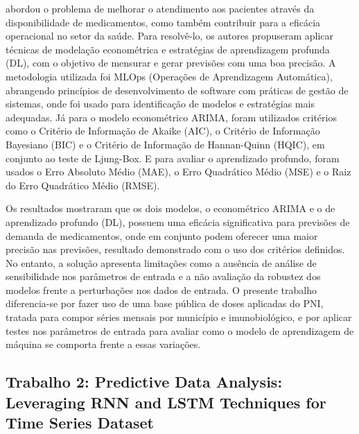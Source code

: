 \documentclass[
    12pt,                %
    openright,           %
    oneside,             %
    a4paper,             %
    english,             %
    brazil               %
]{abntex2}
\begin{document}
 abordou o problema de melhorar o atendimento aos pacientes através da disponibilidade de medicamentos, como também contribuir para a eficácia operacional no setor da saúde. Para resolvê-lo, os autores propuseram aplicar técnicas de modelação econométrica e estratégias de aprendizagem profunda (DL), com o objetivo de mensurar e gerar previsões com uma boa precisão. A metodologia utilizada foi MLOps (Operações de Aprendizagem Automática), abrangendo princípios de desenvolvimento de software com práticas de gestão de sistemas, onde foi usado para identificação de modelos e estratégias mais adequadas. Já para o modelo econométrico ARIMA, foram utilizados critérios como o Critério de Informação de Akaike (AIC), o Critério de Informação Bayesiano (BIC) e o Critério de Informação de Hannan-Quinn (HQIC), em conjunto ao teste de Ljung-Box. E para avaliar o aprendizado profundo, foram usados o Erro Absoluto Médio (MAE), o Erro Quadrático Médio (MSE) e o Raiz do Erro Quadrático Médio (RMSE).

Os resultados mostraram que os dois modelos, o econométrico ARIMA e o de aprendizado profundo (DL), possuem uma eficácia significativa para previsões de demanda de medicamentos, onde em conjunto podem oferecer uma maior precisão nas previsões, resultado demonstrado com o uso dos critérios definidos. No entanto, a solução apresenta limitações como a ausência de análise de sensibilidade nos parâmetros de entrada e a não avaliação da robustez dos modelos frente a perturbações nos dados de entrada. O presente trabalho diferencia-se por fazer uso de uma base pública de doses aplicadas do PNI, tratada para compor séries mensais por município e imunobiológico, e por aplicar testes nos parâmetros de entrada para avaliar como o modelo de aprendizagem de máquina se comporta frente a essas variações.

\subsection{Trabalho 2: Predictive Data Analysis: Leveraging RNN and LSTM Techniques for Time Series Dataset}
\end{document}

